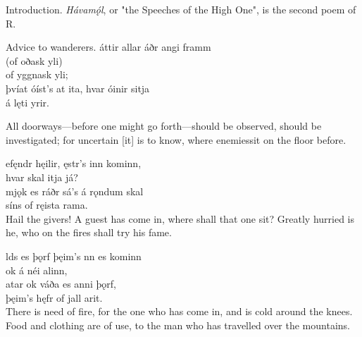 \bookStart

	Introduction.
\small{\emph{Hávamǫ́l}, or "the Speeches of the High One\footnotemark[1]", is the second poem of R.}

	Advice to wanderers.
\bva {}áttir allar \hld áðr angi framm \\%
\ind (of oðask yli)\footnotemark[2] \\%
\ind of yggnask yli; \\%
þvíat óíst's at ita, \hld hvar óinir sitja\footnotemark[3] \\%
\ind á lęti yrir.\\%

\bvb All doorways—before one might go forth—should be observed, should be investigated; for uncertain [it] is to know, where enemies\footnotemark[1] sit on the floor before. \\

\bva {}efęndr hęilir, \hld {}ęstr's inn kominn, \\%
\ind hvar skal itja já? \\%
mjǫk es ráðr \hld sá's á rǫndum skal \\%
\ind síns of ręista rama.\\%

\bvb Hail the givers\footnotemark[5]! A guest has come in, where shall that one sit? Greatly hurried is he, who on the fires shall try his fame. \\

\bva {}lds es þǫrf \hld þęim's nn es kominn \\%
\ind ok á néi alinn, \\%
atar ok váða \hld es anni þǫrf, \\%
\ind þęim's hęfr of jall arit.\\%

\bvb There is need of fire, for the one who has come in, and is cold around the knees. Food and clothing are of use, to the man who has travelled over the mountains. \\

